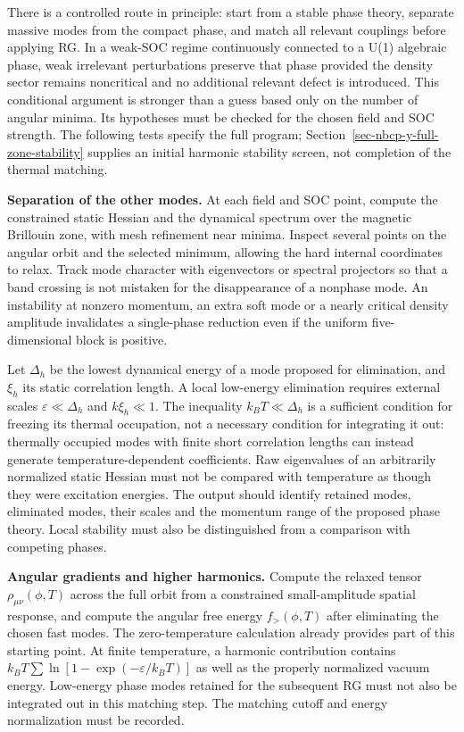 There is a controlled route in principle: start from a stable phase
theory, separate massive modes from the compact phase, and match all
relevant couplings before applying RG. In a weak-SOC regime continuously
connected to a U(1) algebraic phase, weak irrelevant perturbations
preserve that phase provided the density sector remains noncritical and
no additional relevant defect is introduced. This conditional argument
is stronger than a guess based only on the number of angular minima. Its
hypotheses must be checked for the chosen field and SOC strength. The
following tests specify the full program;
Section~\ref{sec-nbcp-y-full-zone-stability} supplies an initial
harmonic stability screen, not completion of the thermal matching.

\textbf{Separation of the other modes.} At each field and SOC point,
compute the constrained static Hessian and the dynamical spectrum over
the magnetic Brillouin zone, with mesh refinement near minima. Inspect
several points on the angular orbit and the selected minimum, allowing
the hard internal coordinates to relax. Track mode character with
eigenvectors or spectral projectors so that a band crossing is not
mistaken for the disappearance of a nonphase mode. An instability at
nonzero momentum, an extra soft mode or a nearly critical density
amplitude invalidates a single-phase reduction even if the uniform
five-dimensional block is positive.

Let \(\Delta_h\) be the lowest dynamical energy of a mode proposed for
elimination, and \(\xi_h\) its static correlation length. A local
low-energy elimination requires external scales
\(\varepsilon\ll\Delta_h\) and \(k\xi_h\ll1\). The inequality
\(k_BT\ll\Delta_h\) is a sufficient condition for freezing its thermal
occupation, not a necessary condition for integrating it out: thermally
occupied modes with finite short correlation lengths can instead
generate temperature-dependent coefficients. Raw eigenvalues of an
arbitrarily normalized static Hessian must not be compared with
temperature as though they were excitation energies. The output should
identify retained modes, eliminated modes, their scales and the momentum
range of the proposed phase theory. Local stability must also be
distinguished from a comparison with competing phases.

\textbf{Angular gradients and higher harmonics.} Compute the relaxed
tensor \(\rho_{\mu\nu}(\phi,T)\) across the full orbit from a
constrained small-amplitude spatial response, and compute the angular
free energy \(f_>(\phi,T)\) after eliminating the chosen fast modes. The
zero-temperature calculation already provides part of this starting
point. At finite temperature, a harmonic contribution contains
\(k_BT\sum\ln[1-\exp(-\varepsilon/k_BT)]\) as well as the properly
normalized vacuum energy. Low-energy phase modes retained for the
subsequent RG must not also be integrated out in this matching step. The
matching cutoff and energy normalization must be recorded.

